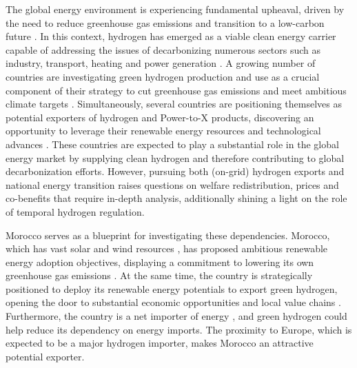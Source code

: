 The global energy environment is experiencing fundamental upheaval, driven by the need to reduce greenhouse gas emissions and transition to a low-carbon future \cite{Davis2018, Victoria2020}. 
In this context, hydrogen has emerged as a viable clean energy carrier capable of addressing the issues of decarbonizing numerous sectors such as industry, transport, heating and power generation \cite{IEA2021,Ueckerdt2021, Gailani2024, Kovac2021, Azadnia2023}. 
A growing number of countries are investigating green hydrogen production and use as a crucial component of their strategy to cut greenhouse gas emissions and meet ambitious climate targets \cite{IEA2021, Zeyen2023}.
Simultaneously, several countries are positioning themselves as potential exporters of hydrogen and Power-to-X products, discovering an opportunity to leverage their renewable energy resources and technological advances \cite{IEA2024}.
These countries are expected to play a substantial role in the global energy market by supplying clean hydrogen and therefore contributing to global decarbonization efforts\cite{IEA2024}. However, pursuing both (on-grid) hydrogen exports and national energy transition raises questions on welfare redistribution, prices and co-benefits that require in-depth analysis, additionally shining a light on the role of temporal hydrogen regulation.

Morocco serves as a blueprint for investigating these dependencies. Morocco, which has vast solar and wind resources \cite{Peters2023, Touili2018, Sterl2022}, has proposed ambitious renewable energy adoption objectives, displaying a commitment to lowering its own greenhouse gas emissions \cite{CAT2021}. At the same time, the country is strategically positioned to deploy its renewable energy potentials to export green hydrogen, opening the door to substantial economic opportunities and local value chains \cite{Ersoy2022}. Furthermore, the country is a net importer of energy \cite{IEA2022}, and green hydrogen could help reduce its dependency on energy imports. The proximity to Europe, which is expected to be a major hydrogen importer, makes Morocco an attractive potential exporter. 


